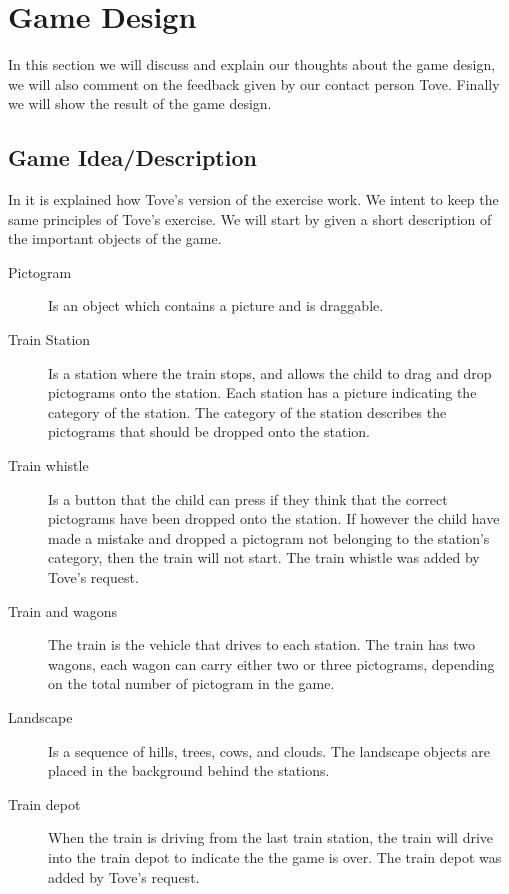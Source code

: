 \section{Game Design}
In this section we will discuss and explain our thoughts about the game design, we will also comment on the feedback given by our contact person Tove. Finally we will show the result of the game design.
\subsection{Game Idea/Description}\label{sec:gameidea}
In  it is explained how Tove's version of the exercise work. We intent to keep the same principles of Tove's exercise. We will start by given a short description of the important objects of the game.
\begin{description}
\item[Pictogram] Is an object which contains a picture and is draggable.
\item[Train Station] Is a station where the train stops, and allows the child to drag and drop pictograms onto the station. Each station has a picture indicating the category of the station. The category of the station describes the pictograms that should be dropped onto the station.  

\item[Train whistle] Is a button that the child can press if they think that the correct pictograms have been dropped onto the station. If however the child have made a mistake and dropped a pictogram not belonging to the station's category, then the train will not start. The train whistle was added by Tove's request.

\item[Train and wagons] The train is the vehicle that drives to each station. The train has two wagons, each wagon can carry either two or three pictograms, depending on the total number of pictogram in the game.

\item[Landscape] Is a sequence of hills, trees, cows, and clouds. The landscape objects are placed in the background behind the stations.

\item[Train depot] When the train is driving from the last train station, the train will drive into the train depot to indicate the the game is over. The train depot was added by Tove's request.
\end{description}
